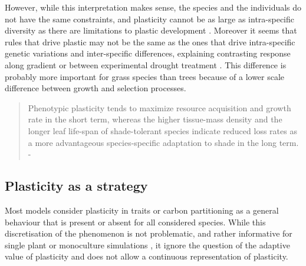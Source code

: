 However, while this interpretation makes sense, the species and the individuals do not have the same constraints, and plasticity cannot be as large as intra-specific diversity as there are limitations to plastic development \parencite{dewitt_costs_1998, auld_re-evaluating_2009}. Moreover it seems that rules that drive plastic may not be the same as the ones that drive intra-specific genetic variations  and inter-specific differences\parencite{ryser_consequences_2000}, explaining contrasting response along gradient or between experimental drought treatment \parencite{kichenin_contrasting_2013, jung_intraspecific_2014}. This difference is probably more important for grass species than trees \parencite{franklin_modeling_2012} because of a lower scale difference between growth and selection processes.

\begin{quotation}
Phenotypic plasticity tends to maximize resource acquisition and growth rate in the short term, whereas the higher tissue-mass density and the longer leaf life-span of shade-tolerant species indicate reduced loss rates as a more advantageous species-specific adaptation to shade in the long term. - \cite{ryser_consequences_2000}
\end{quotation}




\subsection{Plasticity as a strategy}

Most models consider plasticity in traits or carbon partitioning as a general behaviour that is present or absent for all considered species. While this discretisation of the phenomenon is not problematic, and rather informative for single plant or monoculture simulations \cite{maire_plasticity_2013}, it ignore the question of the adaptive value of plasticity and does not allow a continuous representation of plasticity.

